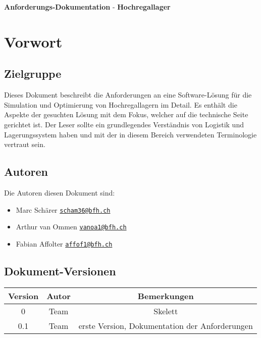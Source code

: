 \documentclass[11pt,a4paper]{article}
\begin{document}
{\huge \textbf{Anforderungs-Dokumentation}} - \textbf{Hochregallager} \\

\section{Vorwort}
%
\subsection{Zielgruppe}
Dieses Dokument beschreibt die Anforderungen an eine Software-Lösung für die Simulation und Optimierung von Hochregallagern im Detail. Es enthält die Aspekte der gesuchten Lösung mit dem Fokus, welcher auf die technische Seite gerichtet ist. Der Leser sollte ein grundlegendes Verständnis von Logistik und Lagerungssystem haben und mit der in diesem Bereich verwendeten Terminologie vertraut sein. 
%
\subsection{Autoren}
Die Autoren diesen Dokument sind:
%
\begin{itemize}
  \item Marc Schärer \href{mailto:scham36@bfh.ch}{\nolinkurl{scham36@bfh.ch}}
  \item Arthur van Ommen \href{mailto:vanoa1@bfh.ch}{\nolinkurl{vanoa1@bfh.ch}}
  \item Fabian Affolter \href{mailto:affof11@bfh.ch}{\nolinkurl{affof1@bfh.ch}}
\end{itemize}
%
\subsection{Dokument-Versionen}

\begin{table}[h]

  \begin{center}
    \begin{tabular}{|c|c|c|}
      \hline
      \textbf{Version} & \textbf{Autor} & \textbf{Bemerkungen} \\
      \hline
      0 & Team & Skelett \\
      0.1 & Team & erste Version, Dokumentation der Anforderungen \\
      \hline
    \end{tabular}
  \end{center}
\end{table}
%
%
\end{document}
